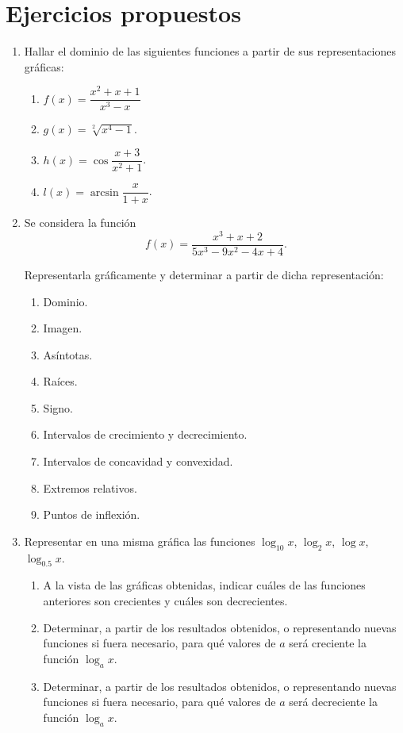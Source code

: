 \section{Ejercicios propuestos}
\begin{enumerate}[leftmargin=*]
\item Hallar el dominio de las siguientes funciones a partir de sus representaciones gráficas:

      \begin{enumerate}
      \item $f(x)=\dfrac{x^{2} + x + 1}{x^{3} - x}$
      \item $g(x)=\sqrt[2]{x^{4}-1}$.
      \item $h(x)=\cos{\dfrac{x + 3}{x^{2} + 1}}$.
      \item $l(x)=\arcsin{\dfrac{x}{1+x}}$.
      \end{enumerate}

\item Se considera la función
      \[
      \ f(x)=\frac{x^{3} + x +2}{5x^{3} - 9x^{2} - 4x + 4}.
      \]

      Representarla gráficamente y determinar a partir de dicha representación:

      \begin{enumerate}
      \item Dominio.
      \item Imagen.
      \item Asíntotas.
      \item Raíces.
      \item Signo.
      \item Intervalos de crecimiento y decrecimiento.
      \item Intervalos de concavidad y convexidad.
      \item Extremos relativos.
      \item Puntos de inflexión.
      \end{enumerate}

\item Representar en una misma gráfica las funciones $\log_{10}{x}$, $\log_{2}{x}$, $\log{x}$, $\log_{0.5}{x}$.
      \begin{enumerate}
      \item A la vista de las gráficas obtenidas, indicar cuáles de las funciones anteriores son crecientes y cuáles son decrecientes.
      \item Determinar, a partir de los resultados obtenidos, o representando nuevas funciones si fuera necesario, para qué valores de $a$ será
            creciente la función $\log_{a}{x}$.
      \item Determinar, a partir de los resultados obtenidos, o representando nuevas funciones si fuera necesario, para qué valores de $a$ será
            decreciente la función $\log_{a}{x}$.
      \end{enumerate}


\end{enumerate}

